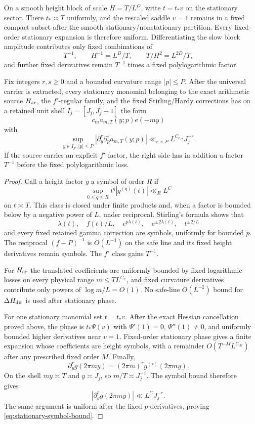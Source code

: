 On a smooth height block of scale $H=T/L^D$, write $t=t_*v$ on the stationary
sector. There $t_*\asymp T$ uniformly, and the rescaled saddle $v=1$ remains in
a fixed compact subset after the smooth stationary/nonstationary partition.
Every fixed-order stationary expansion is therefore uniform.  Differentiating
the slow block amplitude contributes only fixed combinations of
\[
T^{-1},\qquad H^{-1}=L^D/T,
\qquad T/H^2=L^{2D}/T,
\]
and further fixed derivatives remain $T^{-1}$ times a fixed polylogarithmic
factor.

\begin{lemma}
\label{lem:stationary-symbol}
Fix integers $r,s\ge0$ and a bounded curvature range $|p|\le P$.  After the
universal carrier is extracted, every stationary monomial belonging to the
exact arithmetic source $H_{\rm ar}$, the $f'$-regular family, and the fixed
Stirling/Hardy corrections has on a retained
unit shell $I_j=[J_j,J_j+1]$ the form
\[
c_m a_{m,T}(y;p)e(-my)
\]
with
\begin{equation}
\boxed{
\sup_{y\in I_j,\ |p|\le P}
|\partial_y^r\partial_p^s a_{m,T}(y;p)|
\ll_{r,s,P}L^{C_{r,s}}J_j^{-r}.
}
\label{eq:stationary-symbol-bound}
\end{equation}
If the source carries an explicit $f'$ factor, the right side has in addition
a factor $T^{-1}$ before the fixed polylogarithmic loss.
\end{lemma}

\begin{proof}
Call a height factor $g$ a symbol of order $R$ if
\[
\sup_{0\le q\le R}t^q|g^{(q)}(t)|\ll_R L^C
\]
on $t\asymp T$. This class is closed under finite products and, when a factor
is bounded below by a negative power of $L$, under reciprocal. Stirling's
formula shows that
\[
\lambda(t),\quad f(t)/L,\quad e^{p\lambda(t)},\quad
 e^{\pm2\lambda(t)},\quad t^{\pm2/L}
\]
and every fixed retained gamma correction are symbols, uniformly for bounded
$p$.  The reciprocal $(f-P)^{-1}$ is $O(L^{-1})$ on the safe line and its fixed
height derivatives remain symbols.  The $f'$ class gains $T^{-1}$.

For $H_{\rm ar}$ the translated coefficients are uniformly bounded by fixed
logarithmic losses on every physical range $m\le TL^{C_x}$, and fixed curvature
derivatives contribute only powers of $\log m/L=O(1)$.  No safe-line
$O(L^{-2})$ bound for $\Delta H_{\rm dir}$ is used after stationary phase.

For one stationary monomial set $t=t_*v$. After the exact Hessian cancellation
proved above, the phase is $t_*\Psi(v)$ with
$\Psi'(1)=0$, $\Psi''(1)\ne0$, and uniformly bounded higher derivatives near
$v=1$.  Fixed-order stationary phase gives a finite expansion whose
coefficients are height symbols, with a remainder
$O(T^{-M}L^{C_M})$ after any prescribed fixed order $M$.
Finally,
\[
\partial_y^r g(2\pi my)
=(2\pi m)^rg^{(r)}(2\pi my).
\]
On the shell $my\asymp T$ and $y\asymp J_j$, so
$m/T\asymp J_j^{-1}$.  The symbol bound therefore gives
\[
|\partial_y^r g(2\pi my)|\ll L^CJ_j^{-r}.
\]
The same argument is uniform after the fixed $p$-derivatives, proving
\eqref{eq:stationary-symbol-bound}.
\end{proof}
